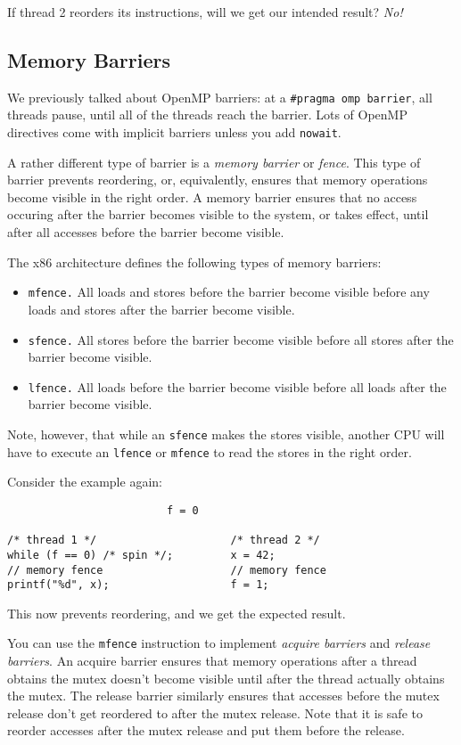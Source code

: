 If thread 2 reorders its instructions, will we get our intended
result? \emph{No!}

\subsection*{Memory Barriers} We previously talked about OpenMP barriers: 
at a {\tt \#pragma omp barrier}, all threads pause, until all of the
threads reach the barrier. Lots of OpenMP directives come with implicit barriers
unless you add {\tt nowait}.

A rather different type of barrier is a \emph{memory barrier} or
\emph{fence}. This type of barrier prevents reordering, or,
equivalently, ensures that memory operations become visible in the
right order. A memory barrier ensures that no access occuring after
the barrier becomes visible to the system, or takes effect, until
after all accesses before the barrier become visible.


The x86 architecture defines the following types of memory 
barriers:

\begin{itemize}
\item {\tt mfence.} All loads and stores before the barrier become
visible before any loads and stores after the barrier become visible.
\item {\tt sfence.} All stores before the barrier become visible before
all stores after the barrier become visible.
\item {\tt lfence.} All loads before the barrier become visible before
all loads after the barrier become visible.
\end{itemize}

Note, however, that while an {\tt sfence} makes the stores visible,
another CPU will have to execute an {\tt lfence} or {\tt mfence} to
read the stores in the right order.

Consider the example again:
  \begin{verbatim}
                         f = 0

/* thread 1 */                     /* thread 2 */
while (f == 0) /* spin */;         x = 42;
// memory fence                    // memory fence
printf("%d", x);                   f = 1;
  \end{verbatim}
This now prevents reordering, and we get the expected result.

You can use the {\tt mfence} instruction to implement \emph{acquire
  barriers} and \emph{release barriers}.  An acquire barrier ensures
that memory operations after a thread obtains the mutex doesn't become
visible until after the thread actually obtains the mutex.
The release barrier similarly ensures that accesses before the mutex
release don't get reordered to after the mutex release. Note that
it is safe to reorder accesses after the mutex release and put them
before the release.

